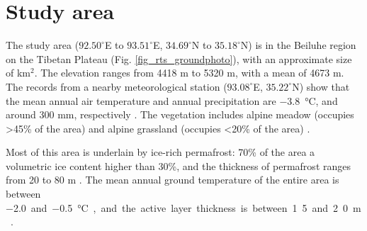 \documentclass[authoryear,preprint,review,12pt]{elsarticle}
\begin{document}
\section{Study area}
\label{sec_studyarea}
The study area ($92.50^\circ$E to $93.51^\circ$E, $34.69^\circ$N to $35.18^\circ$N) is in the Beiluhe region on the Tibetan Plateau (Fig. \ref{fig_rts_groundphoto}), with an approximate size of  km$^2$. The elevation ranges from 4418 m to 5320 m, with a mean of 4673 m. The records from a nearby meteorological station ($93.08^\circ$E, $35.22^\circ$N) show that the mean annual air temperature and annual precipitation are \SI{-3.8}{\celsius}, and around 300 mm, respectively \citep{luo_thermokarst_2015}. The vegetation includes alpine meadow (occupies \textgreater 45\% of the area) and alpine grassland (occupies \textless 20\% of the area) \citep{luo_thermokarst_2015}. 

Most of this area is underlain by ice-rich permafrost: 70\% of the area  a volumetric ice content higher than 30\%, 
and the thickness of permafrost ranges from 20 to 80 m \citep{zhou_geocryology_2000, luo_thermokarst_2015}. The mean annual ground temperature of the entire area is between \SI{-2.0} and \SI{-0.5}{\celsius}, and the active layer thickness is between 1.5 and 2.0 m \citep{zhou_geocryology_2000, luo_thermokarst_2015, wu2010changes, wu2015changes}. %
\end{document}
